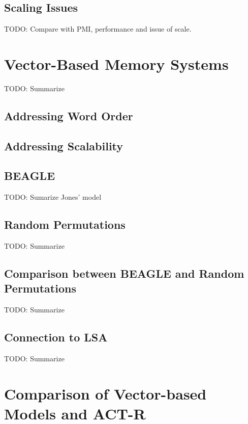 \documentclass[man]{apa6}
\begin{document}
\subsection{Scaling Issues}

TODO: Compare with PMI, performance and issue of scale. \cite{Budiu2007}

\section{Vector-Based Memory Systems}

TODO: Summarize \cite{Plate1995}

\subsection{Addressing Word Order}

\subsection{Addressing Scalability}

\subsection{BEAGLE}

TODO: Sumarize Jones' model \cite{Jones2007}

\subsection{Random Permutations}

TODO: Summarize \cite{Sahlgren2008}

\subsection{Comparison between BEAGLE and Random Permutations}

TODO: Summarize \cite{Recchia2010}

\subsection{Connection to LSA}

TODO: Summarize \cite{Kanerva2000}


\section{Comparison of Vector-based Models and ACT-R}
\end{document}
